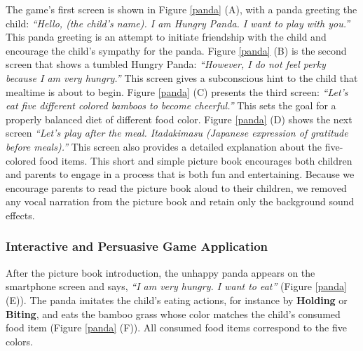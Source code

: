The game's first screen is shown in Figure \ref{panda} (A), with a panda greeting the child: 
\textit{``Hello, (the child's name). I am Hungry Panda. I want to play with you.''} 
This panda greeting is an attempt to initiate friendship with the child 
and encourage the child's sympathy for the panda. 
Figure \ref{panda} (B) is the second screen that shows a tumbled Hungry Panda: 
\textit{``However, I do not feel perky because I am very hungry.''} 
This screen gives a subconscious hint to the child that mealtime is about to begin. 
Figure \ref{panda} (C) presents the third screen: 
\textit{``Let's eat five different colored bamboos to become cheerful.''} 
This sets the goal for a properly balanced diet of different food color. 
Figure \ref{panda} (D) shows the next screen 
\textit{``Let's play after the meal. Itadakimasu (Japanese expression of gratitude before meals).''} 
This screen also provides a detailed explanation about the five-colored food items. 
This short and simple picture book encourages both children and parents 
to engage in a process that is both fun and entertaining. 
Because we encourage parents to read the picture book aloud to their children, 
we removed any vocal narration from the picture book and retain only the background sound effects. 

\subsubsection{Interactive and Persuasive Game Application}
After the picture book introduction, 
the unhappy panda appears on the smartphone screen and says, 
\textit{``I am very hungry. I want to eat''} (Figure \ref{panda} (E)). 
The panda imitates the child's eating actions, 
for instance by \textbf{Holding} or \textbf{Biting}, 
and eats the bamboo grass whose color matches the child's consumed food item (Figure \ref{panda} (F)). 
All consumed food items correspond to the five colors.

